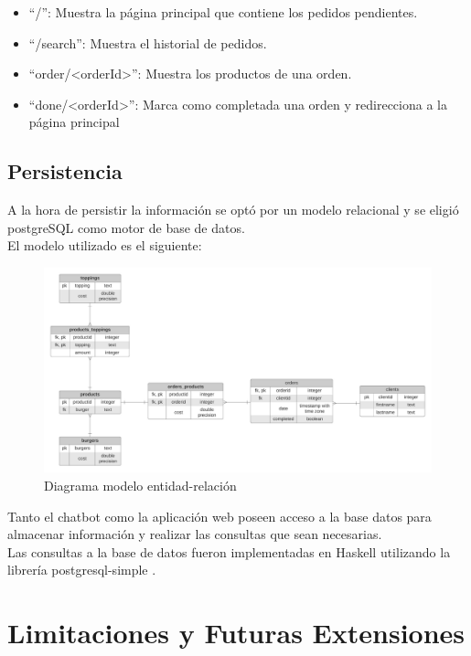 \documentclass[a4paper,12pt]{article}
\begin{document}
\begin{itemize}
	\item 
	\color{blue}“/”\color{black}: Muestra la página principal que contiene los pedidos pendientes.
	\item 
	\color{blue}“/search”\color{black}: Muestra el historial de pedidos.
	\item
	\color{blue}“order/<orderId>”\color{black}: Muestra los productos de una orden.
	\item
	\color{blue}“done/<orderId>”\color{black}: Marca como completada una orden y redirecciona a la página principal
\end{itemize}

\subsection{Persistencia}

A la hora de persistir la información se optó por un modelo relacional y se eligió postgreSQL como motor de base de datos.
\\
El modelo utilizado es el siguiente:

\begin{figure}[H]
	\centering
	\includegraphics[width=1.0\linewidth]{diagrama-er.jpeg}
	\caption{Diagrama modelo entidad-relación}
	\label{fig:Diagrama de er}
\end{figure}

Tanto el chatbot como la aplicación web poseen acceso a la base datos para almacenar información y realizar las consultas que sean necesarias. 
\\
Las consultas a la base de datos fueron implementadas en Haskell utilizando la librería postgresql-simple \cite{postgresql-simple}.

\pagebreak

\section{Limitaciones y Futuras Extensiones}
\end{document}
